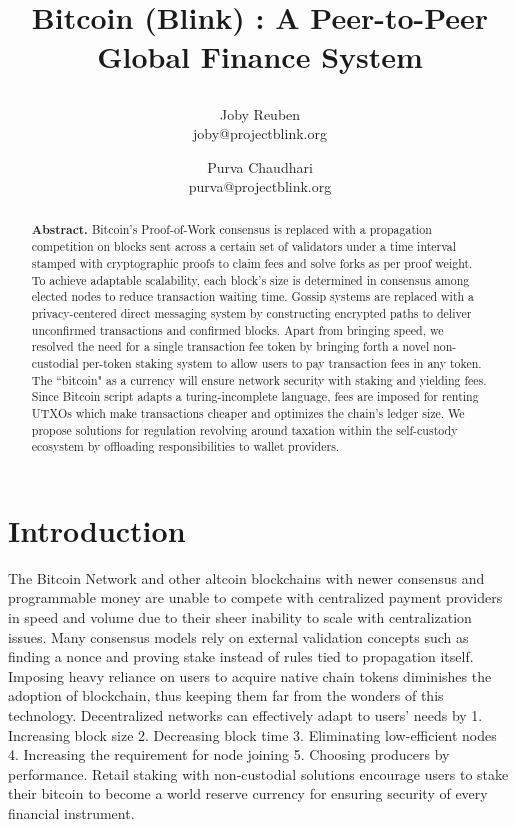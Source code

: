 \documentclass[a4paper,	10pt]{extarticle}
\title{
 \large \textbf{Bitcoin (Blink) : A Peer-to-Peer Global Finance System}
\author{ \myfontt Joby Reuben \\ \myfontt joby@projectblink.org \and  \myfontt Purva Chaudhari \\ \myfontt purva@projectblink.org}}
\date{}
\begin{document}
\maketitle
\begin{abstract}
\noindent \textbf{Abstract.} Bitcoin's Proof-of-Work consensus is replaced with a propagation competition on blocks sent across a certain set of validators under a time interval stamped with cryptographic proofs to claim fees and solve forks as per proof weight. To achieve adaptable scalability, each block's size is determined in consensus among elected nodes to reduce transaction waiting time. Gossip systems are replaced with a privacy-centered direct messaging system by constructing encrypted paths to deliver unconfirmed transactions and confirmed blocks. Apart from bringing speed, we resolved the need for a single transaction fee token by bringing forth a novel non-custodial per-token staking system to allow users to pay transaction fees in any token. The ``bitcoin" as a currency will ensure network security with staking and yielding fees. Since Bitcoin script adapts a turing-incomplete language, fees are imposed for renting UTXOs which make transactions cheaper and optimizes the chain's ledger size. We propose solutions for regulation revolving around taxation within the self-custody ecosystem by offloading responsibilities to wallet providers. 
\end{abstract}
\section{Introduction}
The Bitcoin Network \cite{nakamoto2008bitcoin} and other altcoin blockchains with newer consensus and programmable money are unable to compete with centralized payment providers in speed and volume due to their sheer inability to scale with centralization issues. Many consensus models rely on external validation concepts such as finding a nonce and proving stake instead of rules tied to propagation itself. Imposing heavy reliance on users to acquire native chain tokens diminishes the adoption of blockchain, thus keeping them far from the wonders of this technology. Decentralized networks can effectively adapt to users’ needs by 1. Increasing block size 2. Decreasing block time 3. Eliminating low-efficient nodes 4. Increasing the requirement for node joining 5. Choosing producers by performance. Retail staking with non-custodial solutions encourage users to stake their bitcoin to become a world reserve currency for ensuring security of every financial instrument.
\end{document}

